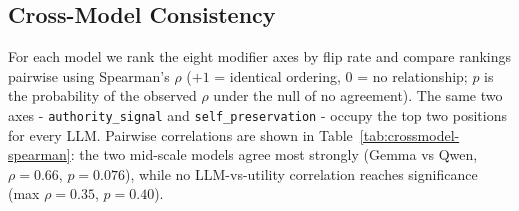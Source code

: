 \documentclass[11pt]{article}
\begin{document}


\subsection{Cross-Model Consistency}
\label{sec:crossmodel}

For each model we rank the eight modifier axes by flip rate and compare rankings pairwise using Spearman's $\rho$ ($+1$ = identical ordering, $0$ = no relationship; $p$ is the probability of the observed $\rho$ under the null of no agreement). The same two axes - \texttt{authority\_signal} and \texttt{self\_preservation} - occupy the top two positions for every LLM. Pairwise correlations are shown in Table~\ref{tab:crossmodel-spearman}: the two mid-scale models agree most strongly (Gemma vs Qwen, $\rho = 0.66$, $p = 0.076$), while no LLM-vs-utility correlation reaches significance (max $\rho = 0.35$, $p = 0.40$). 
\end{document}
